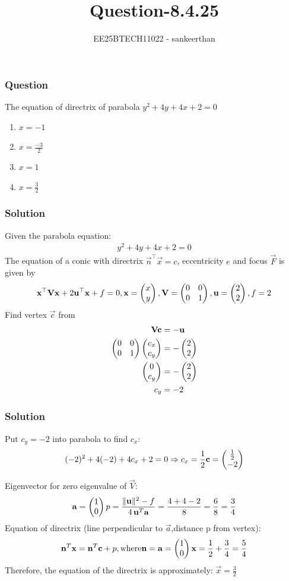\documentclass{beamer}
\title{Question-8.4.25}
\author{EE25BTECH11022 - sankeerthan}
\date{}
\begin{document}
\frame{\titlepage}

\begin{frame}
\frametitle{Question}
The equation of directrix of parabola $y^2+4y+4x+2=0$
\begin{enumerate}
     \item $x=-1$
     \item $x=\frac{-3}{2}$
     \item $x=1$
     \item $x=\frac{3}{2}$
\end{enumerate}
\end{frame}

\begin{frame}
\frametitle{Solution}
Given the parabola equation:
\begin{align}
y^2 + 4y + 4x + 2 = 0
\end{align}
The equation of a conic with directrix $\vec{n}^\top \vec{x} = c$, eccentricity $e$ and focus $\vec{F}$ is given by
\begin{align}
\mathbf{x}^\top\mathbf{V}\mathbf{x} + 2\mathbf{u}^\top\mathbf{x} + f = 0,\mathbf{x} = \begin{pmatrix}x \\ y\end{pmatrix},
\mathbf{V} =\begin{pmatrix}0 & 0 \\0 & 1\end{pmatrix},\mathbf{u} =\begin{pmatrix}2 \\ 2\end{pmatrix},f = 2
\end{align}
Find vertex $\vec{c}$ from
\begin{align}
\mathbf{V} \mathbf{c} &= -\mathbf{u}  \\
\begin{pmatrix}0 & 0 \\0 & 1\end{pmatrix}\begin{pmatrix}c_x \\c_y\end{pmatrix} &=-\begin{pmatrix}2 \\ 2\end{pmatrix} \\
\begin{pmatrix}0 \\c_y\end{pmatrix} &=-\begin{pmatrix}2 \\ 2\end{pmatrix} \\
c_y &= -2
\end{align}
\end{frame}
\begin{frame}
\frametitle{Solution}
Put $c_y=-2$ into parabola to find  $c_x$:
\begin{align}
(-2)^2 + 4(-2) + 4 c_x + 2 = 0  \Rightarrow  c_x = \frac{1}{2}
\mathbf{c} = \begin{pmatrix} \frac{1}{2} \\ -2 \end{pmatrix}
\end{align}

Eigenvector for zero eigenvalue of $\vec{V}$:
\begin{align}
\mathbf{a} =\begin{pmatrix}1 \\ 0\end{pmatrix}
p = \frac{\|\mathbf{u}\|^2 - f}{4 \, \mathbf{u}^T \mathbf{a}} = \frac{4 + 4 - 2}{8} = \frac{6}{8} = \frac{3}{4}
\end{align}
Equation of directrix (line perpendicular to $\vec{a}$,distance p from vertex):
\begin{align}
\mathbf{n}^T \mathbf{x} = \mathbf{n}^T \mathbf{c} + p,\text{where}\mathbf{n}=\mathbf{a}=\begin{pmatrix}1\\0\end{pmatrix}
\mathbf{x} = \frac{1}{2} + \frac{3}{4} = \frac{5}{4}
\end{align}
Therefore, the equation of the directrix is approximately:
$\vec{x} = \frac{3}{2}$
\end{frame}
\end{document}
